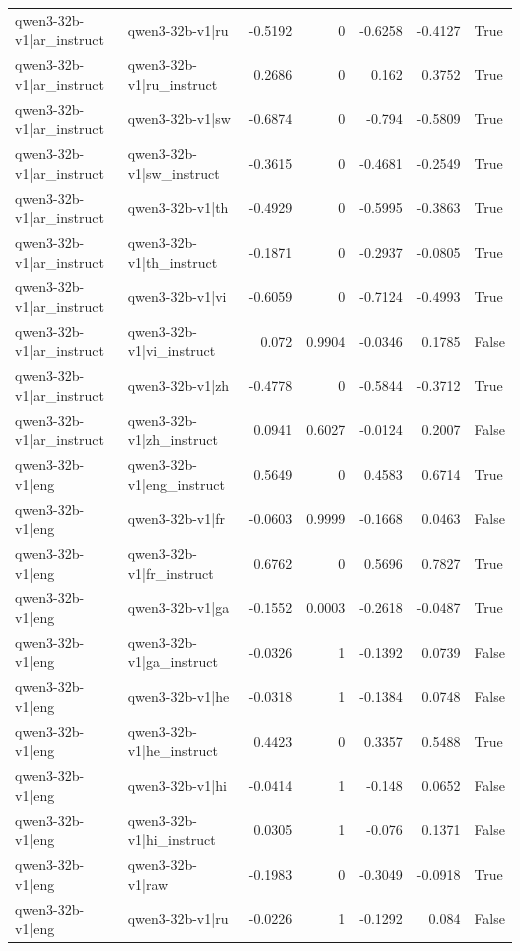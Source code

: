 \begin{table}
\begin{tabular}{l l r r r r l}
qwen3-32b-v1|ar_instruct & qwen3-32b-v1|ru & -0.5192 & 0 & -0.6258 & -0.4127 & True \\
qwen3-32b-v1|ar_instruct & qwen3-32b-v1|ru_instruct & 0.2686 & 0 & 0.162 & 0.3752 & True \\
qwen3-32b-v1|ar_instruct & qwen3-32b-v1|sw & -0.6874 & 0 & -0.794 & -0.5809 & True \\
qwen3-32b-v1|ar_instruct & qwen3-32b-v1|sw_instruct & -0.3615 & 0 & -0.4681 & -0.2549 & True \\
qwen3-32b-v1|ar_instruct & qwen3-32b-v1|th & -0.4929 & 0 & -0.5995 & -0.3863 & True \\
qwen3-32b-v1|ar_instruct & qwen3-32b-v1|th_instruct & -0.1871 & 0 & -0.2937 & -0.0805 & True \\
qwen3-32b-v1|ar_instruct & qwen3-32b-v1|vi & -0.6059 & 0 & -0.7124 & -0.4993 & True \\
qwen3-32b-v1|ar_instruct & qwen3-32b-v1|vi_instruct & 0.072 & 0.9904 & -0.0346 & 0.1785 & False \\
qwen3-32b-v1|ar_instruct & qwen3-32b-v1|zh & -0.4778 & 0 & -0.5844 & -0.3712 & True \\
qwen3-32b-v1|ar_instruct & qwen3-32b-v1|zh_instruct & 0.0941 & 0.6027 & -0.0124 & 0.2007 & False \\
qwen3-32b-v1|eng & qwen3-32b-v1|eng_instruct & 0.5649 & 0 & 0.4583 & 0.6714 & True \\
qwen3-32b-v1|eng & qwen3-32b-v1|fr & -0.0603 & 0.9999 & -0.1668 & 0.0463 & False \\
qwen3-32b-v1|eng & qwen3-32b-v1|fr_instruct & 0.6762 & 0 & 0.5696 & 0.7827 & True \\
qwen3-32b-v1|eng & qwen3-32b-v1|ga & -0.1552 & 0.0003 & -0.2618 & -0.0487 & True \\
qwen3-32b-v1|eng & qwen3-32b-v1|ga_instruct & -0.0326 & 1 & -0.1392 & 0.0739 & False \\
qwen3-32b-v1|eng & qwen3-32b-v1|he & -0.0318 & 1 & -0.1384 & 0.0748 & False \\
qwen3-32b-v1|eng & qwen3-32b-v1|he_instruct & 0.4423 & 0 & 0.3357 & 0.5488 & True \\
qwen3-32b-v1|eng & qwen3-32b-v1|hi & -0.0414 & 1 & -0.148 & 0.0652 & False \\
qwen3-32b-v1|eng & qwen3-32b-v1|hi_instruct & 0.0305 & 1 & -0.076 & 0.1371 & False \\
qwen3-32b-v1|eng & qwen3-32b-v1|raw & -0.1983 & 0 & -0.3049 & -0.0918 & True \\
qwen3-32b-v1|eng & qwen3-32b-v1|ru & -0.0226 & 1 & -0.1292 & 0.084 & False \\

\end{tabular}
\end{table}
